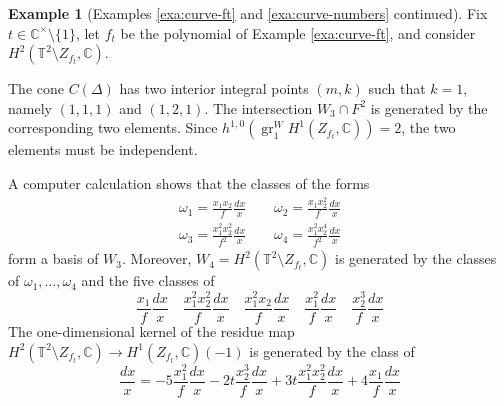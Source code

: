 \documentclass[11pt, reqno]{amsart}
\theoremstyle{plain}
\theoremstyle{definition}
\newtheorem{example}[thm]{Example}
\newcommand{\CC}{\mathbb{C}}
\newcommand{\TT}{\mathbb{T}}
\DeclareMathOperator{\gr}{gr}
\begin{document}
\begin{example}[Examples \ref{exa:curve-ft} and \ref{exa:curve-numbers} continued]
\label{exa:curve-cone} Fix $t\in \CC^\times \setminus \{ 1\}$, let $f_t$ be the polynomial of Example \ref{exa:curve-ft}, and consider $H^2(\TT^2 \setminus Z_{f_t}, \CC)$.

The cone $C(\Delta)$ has two interior integral points $(m,k)$ such that $k=1$, namely $(1,1,1)$ and $(1,2,1)$. The intersection $W_3 \cap F^2$ is generated by the corresponding two elements. Since $h^{1,0}( \gr_1^WH^1(Z_{f_t},\CC))=2$, the two elements must be independent. 

A computer calculation shows that the classes of the forms 
\begin{align*}
    \omega_1  = \frac{x_1x_2}{f} \frac{dx}{x} \qquad \omega_2  = \frac{x_1x_2^2}{f} \frac{dx}{x}\\
    \omega_3  = \frac{x_1^2x_2^2}{f^2} \frac{dx}{x} \qquad \omega_4  = \frac{x_1^2x_2^4}{f^2} \frac{dx}{x}
\end{align*}
form a basis of $W_3$.
Moreover, $W_4=H^2 (\TT^2\setminus Z_{f_t}, \CC)$ is generated by the classes of $\omega_1, \dots, \omega_4$ and the five classes of
\[
\frac{x_1}{f}\frac{dx}{x} \quad   \frac{x_1^2x_2^2}{f}\frac{dx}{x} \quad  \frac{x_1^2 x_2}{f}\frac{dx}{x} \quad \frac{x_1^2}{f}\frac{dx}{x} \quad\frac{x_2^3}{f}\frac{dx}{x}
\]
The one-dimensional kernel of the residue map $H^2(\TT^2 \setminus Z_{f_t}, \CC)\to H^1(Z_{f_t}, \CC)(-1)$ is generated by the class of
\[
\frac{dx}{x } = -5 \frac{x_1^2}{f}\frac{dx}{x} -2t \frac{x_2^3}{f}\frac{dx}{x} +3t \frac{x_1^2x_2^2}{f}\frac{dx}{x}  +4 \frac{x_1}{f}\frac{dx}{x}  
\]


\end{example}
\end{document}
